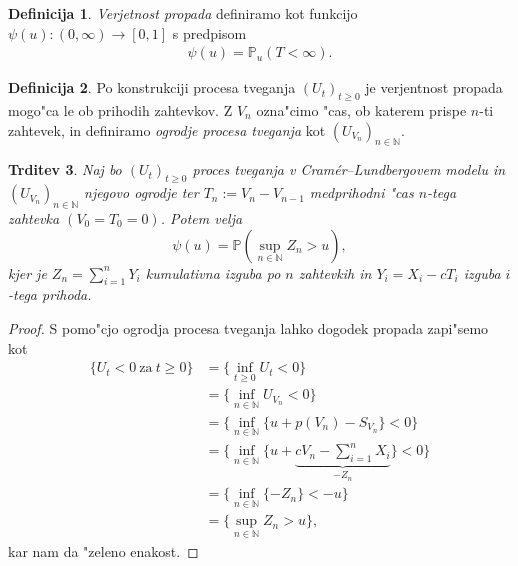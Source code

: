 \documentclass[12pt, a4paper, reqno]{amsart}
\theoremstyle{definition}
\newtheorem{definicija}{Definicija}[section]
\theoremstyle{plain}
\newtheorem{trditev}[definicija]{Trditev}
\newcommand{\N}{\mathbb{N}}
\newcommand{\Prob}{\mathbb{P}}
\newcommand{\1}{\mathds{1}}
\begin{document}
        \begin{definicija}
            \textit{Verjetnost propada} definiramo kot funkcijo $\psi(u): (0,\infty) \to [0,1]$ 
            s predpisom
            \begin{align*}
                \psi(u) = \Prob_u(T<\infty).
            \end{align*}
            \label{def:VerjetnostPropada}
        \end{definicija}

        \begin{definicija}
            Po konstrukciji procesa tveganja $(U_t)_{t\geq0}$ je verjentnost propada mogo"ca le ob 
            prihodih zahtevkov. %
            Z $V_n$ ozna"cimo "cas, ob katerem prispe $n$-ti zahtevek, in definiramo 
            \textit{ogrodje procesa tveganja} kot $(U_{V_n})_{n\in\N}$.
            \label{def:ogrodjeProcesaTveganja}
        \end{definicija}

        \begin{trditev}
            Naj bo $(U_t)_{t\geq0}$ proces tveganja v Cramér--Lundbergovem modelu in $(U_{V_n})_{n\in\N}$ 
            njegovo ogrodje ter $T_n := V_n - V_{n-1}$ medprihodni "cas $n$-tega zahtevka 
            $(V_0 = T_0 = 0)$. Potem velja 
            \begin{equation*}
                \psi(u) = \Prob\left(\sup_{n\in\N}Z_n > u\right),
            \end{equation*}
            kjer je $Z_n = \sum_{i=1}^nY_i$  kumulativna izguba po $n$ zahtevkih in $Y_i = X_i - cT_i$
            izguba $i$-tega prihoda.
            \label{trd:verjetnostPropadaZOgrodjem}
        \end{trditev}

        \begin{proof}

            S pomo"cjo ogrodja procesa tveganja lahko dogodek propada zapi"semo kot
            \begin{align*}
                \bigl\{U_t<0 \ \text{za} \ t\geq 0\bigr\} &= 
                                \biggl\{\inf_{t\geq0}U_t<0\biggr\} \\
                              &= \biggl\{\inf_{n\in\N}U_{V_n}<0\biggr\} \\
                              &= \biggl\{\inf_{n\in\N}\bigl\{u + p(V_n) - S_{V_n}\bigr\} < 0\biggr\} \\
                              &= \biggl\{\inf_{n\in\N}\biggl\{u + 
                              \underbrace{cV_n - \sum_{i=1}^nX_i}_{-Z_n}\biggr\} < 0\biggr\} \\
                              &= \biggl\{\inf_{n\in\N}\{-Z_n\} < -u\biggr\} \\
                              &= \biggl\{\sup_{n\in\N}Z_n > u\biggr\},
            \end{align*}
            kar nam da "zeleno enakost.
        \end{proof}
\end{document}
